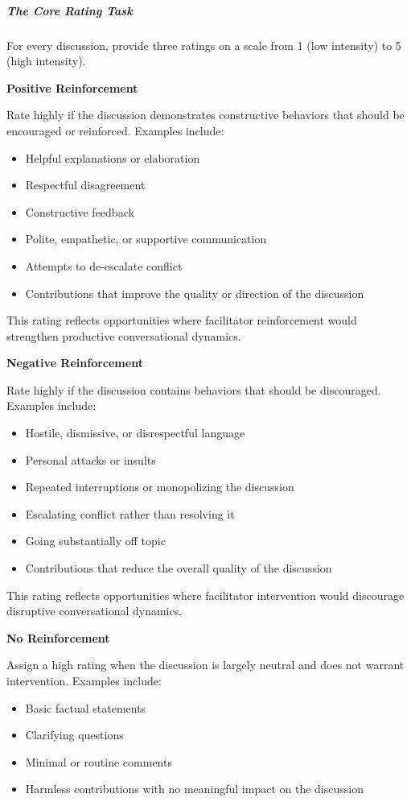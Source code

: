 \documentclass[11pt]{article}
\theoremstyle{definition}
\theoremstyle{plain}
\begin{document}
\subparagraph{The Core Rating Task}

For every discussion, provide three ratings on a scale from 1 (low intensity) to 5 (high intensity).

\textbf{Positive Reinforcement}

Rate highly if the discussion demonstrates constructive behaviors that should be encouraged or reinforced. Examples include:
\begin{itemize}
	\item Helpful explanations or elaboration
	\item Respectful disagreement
	\item Constructive feedback
	\item Polite, empathetic, or supportive communication
	\item Attempts to de-escalate conflict
	\item Contributions that improve the quality or direction of the discussion
\end{itemize}

This rating reflects opportunities where facilitator reinforcement would strengthen productive conversational dynamics.

\textbf{Negative Reinforcement}

Rate highly if the discussion contains behaviors that should be discouraged. Examples include:
\begin{itemize}
	\item Hostile, dismissive, or disrespectful language
	\item Personal attacks or insults
	\item Repeated interruptions or monopolizing the discussion
	\item Escalating conflict rather than resolving it
	\item Going substantially off topic
	\item Contributions that reduce the overall quality of the discussion
\end{itemize}

This rating reflects opportunities where facilitator intervention would discourage disruptive conversational dynamics.

\textbf{No Reinforcement}

Assign a high rating when the discussion is largely neutral and does not warrant intervention. Examples include:
\begin{itemize}
	\item Basic factual statements
	\item Clarifying questions
	\item Minimal or routine comments
	\item Harmless contributions with no meaningful impact on the discussion
\end{itemize}
\end{document}
